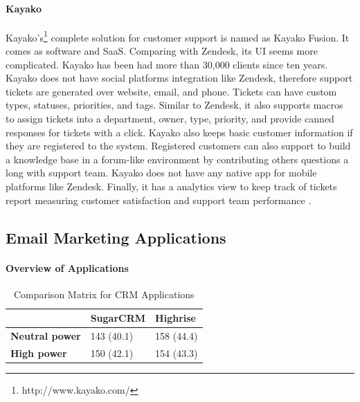 \paragraph{Kayako}
Kayako's\footnote{http://www.kayako.com/} complete solution for customer support is named as Kayako Fusion. It comes as software and \ac{SaaS}. Comparing with Zendesk, its \ac{UI} seems more complicated. Kayako has been had more than 30,000 clients since ten years. Kayako does not have social platforms integration like Zendesk, therefore support tickets are generated over website, email, and phone. Tickets can have custom types, statuses, priorities, and tags. Similar to Zendesk, it also supports macros to assign tickets into a department, owner, type, priority, and provide canned responses for tickets with a click. Kayako also keeps basic customer information if they are registered to the system. Registered customers can also support to build a knowledge base in a forum-like environment by contributing others questions a long with support team. Kayako does not have any native app for mobile platforms like Zendesk. Finally, it has a analytics view to keep track of tickets report measuring customer satisfaction and support team performance \citep{KayakoInc.2013,KayakoInc.2013a}.

\subsection{Email Marketing Applications}
\label{subsec:3.1.3:EmaiMarktAppl}

\paragraph{Overview of Applications}

\begin{table}[!ht]
\begin{center}
	\caption[Comparison Matrix for CRM Applications]{Comparison Matrix for CRM Applications} \label{tab:comp_matr_crm}
    \begin{tabular}{ p{3cm} p{3cm}  p{3cm} }
	\hline
	& \textbf{SugarCRM} & \textbf{Highrise} \\ \hline
	\textbf{Neutral power} & 143 (40.1) & 158 (44.4) \\
	\textbf{High power} & 150 (42.1) & 154 (43.3) \\ \hline
    \end{tabular}
\end{center}
\end{table}

